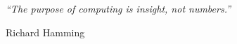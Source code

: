 \begin{titlingpage}

\null
\vfill

\begin{flushright}
{\huge \emph{``The purpose of computing is insight, not numbers.''}}\\

\vspace{10pt}

{\LARGE Richard Hamming}
\end{flushright}

\vfill
\end{titlingpage}
